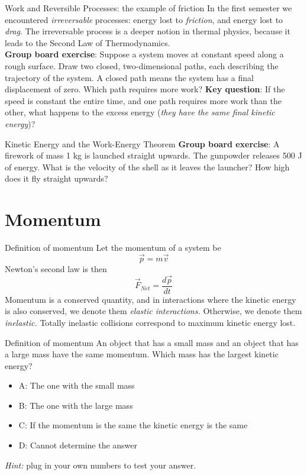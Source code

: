 \documentclass{beamer}
\begin{document}
\begin{frame}{Work and Reversible Processes: the example of friction}
\small
In the first semester we encountered \textit{irreversable} processes: energy lost to \textit{friction}, and energy lost to \textit{drag}. \alert{The irreversable process is a deeper notion in thermal physics}, because it leads to the Second Law of Thermodynamics. \\ \vspace{0.5cm}
\textbf{Group board exercise}: Suppose a system moves at constant speed along a rough surface.  Draw two closed, two-dimensional paths, each describing the trajectory of the system.  A closed path means the system has a final displacement of zero.  Which path requires more work?  \textbf{Key question}: If the speed is constant the entire time, and one path requires more work than the other, what happens to the excess energy (\textit{they have the same final kinetic energy})?
\end{frame}

\begin{frame}{Kinetic Energy and the Work-Energy Theorem}
\textbf{Group board exercise}: A firework of mass 1 kg is launched straight upwards.  The gunpowder releases 500 J of energy.  What is the velocity of the shell as it leaves the launcher?  How high does it fly straight upwards?
\end{frame}

\section{Momentum}

\begin{frame}{Definition of momentum}
Let the momentum of a system be
\begin{equation}
\vec{p} = m \vec{v}
\end{equation}
Newton's second law is then
\begin{equation}
\vec{F}_{Net} = \frac{d\vec{p}}{dt}
\end{equation}
Momentum is a conserved quantity, and in interactions where the kinetic energy is also conserved, we denote them \textit{elastic interactions.} Otherwise, we denote them \textit{inelastic.}  Totally inelastic collisions correspond to maximum kinetic energy lost.
\end{frame}

\begin{frame}{Definition of momentum}
An object that has a small mass and an object that has a large mass have the same momentum. Which mass has the largest kinetic energy?
\begin{itemize}
\item A: The one with the small mass
\item B: The one with the large mass
\item C: If the momentum is the same the kinetic energy is the same
\item D: Cannot determine the answer
\end{itemize}
\textit{Hint:} plug in your own numbers to test your answer.
\end{frame}
\end{document}
